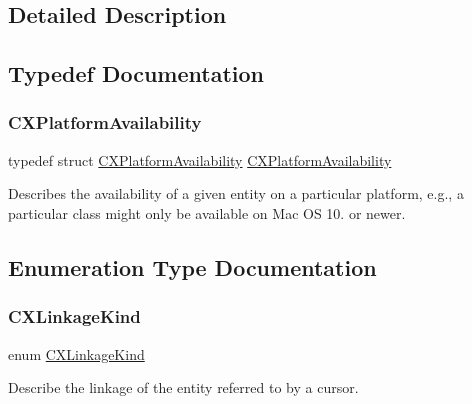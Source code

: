 \subsection{Detailed Description}


\subsection{Typedef Documentation}
\mbox{\label{group__CINDEX__CURSOR__MANIP_ga0b3c1f89b3a9bf57c567884e7ebe41c4}} 
\subsubsection{\texorpdfstring{C\+X\+Platform\+Availability}{CXPlatformAvailability}}
{\footnotesize\ttfamily typedef struct \mbox{\hyperlink{structCXPlatformAvailability}{C\+X\+Platform\+Availability}}  \mbox{\hyperlink{structCXPlatformAvailability}{C\+X\+Platform\+Availability}}}

Describes the availability of a given entity on a particular platform, e.\+g., a particular class might only be available on Mac OS 10. or newer. 

\subsection{Enumeration Type Documentation}
\mbox{\label{group__CINDEX__CURSOR__MANIP_gace57c68a7a11b0967b184a7ef9fbeb9e}} 
\subsubsection{\texorpdfstring{C\+X\+Linkage\+Kind}{CXLinkageKind}}
{\footnotesize\ttfamily enum \mbox{\hyperlink{group__CINDEX__CURSOR__MANIP_gace57c68a7a11b0967b184a7ef9fbeb9e}{C\+X\+Linkage\+Kind}}}



Describe the linkage of the entity referred to by a cursor. 

